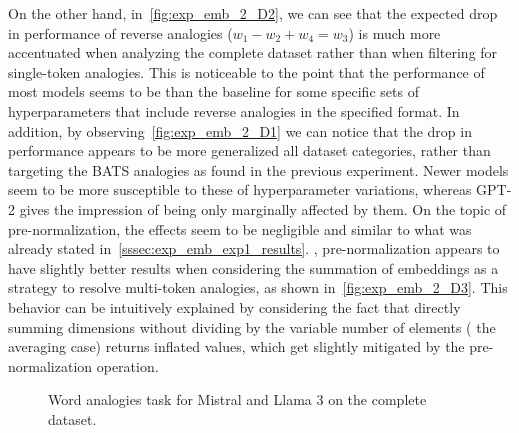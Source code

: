 On the other hand, in~\cref{fig:exp_emb_2_D2}, we can see that the expected drop in performance of reverse analogies ($w_1 - w_2 + w_4 = w_3$) is much more accentuated when analyzing the complete dataset rather than when filtering for single-token analogies.
This is noticeable to the point that the performance of most models seems to be  than the baseline for some specific sets of hyperparameters that include reverse analogies in the specified format.
In addition, by observing~\cref{fig:exp_emb_2_D1} we can notice that the drop in performance appears to be more generalized  all dataset categories, rather than targeting the BATS analogies as found in the previous experiment.
Newer models seem to be more susceptible to these  of hyperparameter variations, whereas GPT-2 gives the impression of being only marginally affected by them.
On the topic of pre-normalization, the effects seem to be negligible and similar to what was already stated in~\cref{sssec:exp_emb_exp1_results}.
, pre-normalization appears to have slightly better results when considering the summation of embeddings as a strategy to resolve multi-token analogies, as shown in~\cref{fig:exp_emb_2_D3}.
This behavior can be intuitively explained by considering the fact that directly summing dimensions without dividing by the variable number of elements ( the averaging case) returns inflated values, which get slightly mitigated by the pre-normalization operation.

\begin{figure}[t!]
    \centering
    \quad
    \begingroup
    \captionsetup{width=0.9\textwidth/2}
    \endgroup
    \caption{Word analogies task for Mistral and Llama 3 on the complete dataset.}
    \label{fig:exp_emb_2_D}
\end{figure}

